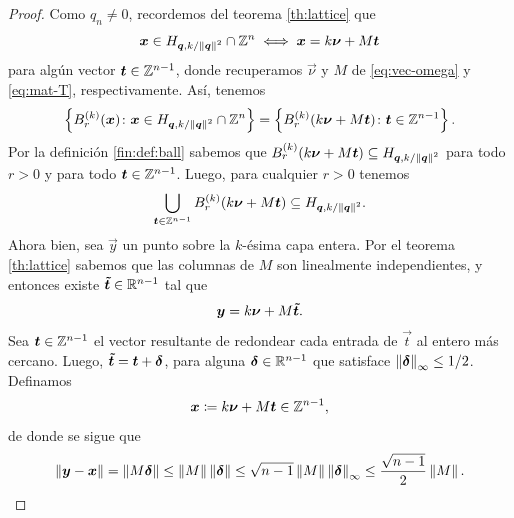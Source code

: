\begin{proof}
	Como $q_n \neq 0$, recordemos del teorema \eqref{th:lattice} que
	\begin{equation*}
		\boldsymbol{x} \in H_{\boldsymbol{\boldsymbol{q}}, k/\left\lVert \boldsymbol{\boldsymbol{q}} \right\rVert^{2}} \cap \mathbb{Z}^n \iff \boldsymbol{x} = k\boldsymbol{\nu} + M\boldsymbol{t}
	\end{equation*}
	para algún vector $\boldsymbol{t} \in \mathbb{Z}^{n-1}$, donde recuperamos $\vec{\nu}$ y $M$ de
	\eqref{eq:vec-omega} y \eqref{eq:mat-T}, respectivamente. Así, tenemos
	\begin{equation*}
		\left\lbrace B_r^{(k)}(\boldsymbol{x}) \colon \boldsymbol{x} \in H_{\boldsymbol{\boldsymbol{q}}, k/\left\lVert \boldsymbol{\boldsymbol{q}} \right\rVert^{2}} \cap
			\mathbb{Z}^n \right\rbrace
			=
		\left\lbrace B_r^{(k)}(k\boldsymbol{\nu} + M\boldsymbol{t}) \colon \boldsymbol{t} \in \mathbb{Z}^{n-1} \right\rbrace.
	\end{equation*}
	Por la definición \ref{fin:def:ball} sabemos que $B_r^{(k)}(k\boldsymbol{\nu} + M\boldsymbol{t}) \subseteq
	H_{\boldsymbol{\boldsymbol{q}}, k/\left\lVert \boldsymbol{\boldsymbol{q}} \right\rVert^{2}}$ para todo $r > 0$ y para todo $\boldsymbol{t} \in \mathbb{Z}^{n-1}$. Luego, para
	cualquier $r > 0$ tenemos
	\begin{equation}
		\label{eq:ball-cover:1}
		\bigcup_{\boldsymbol{t} \in \mathbb{Z}^{n-1}}B_r^{(k)}(k\boldsymbol{\nu} + M\boldsymbol{t}) \subseteq
		H_{\boldsymbol{\boldsymbol{q}}, k/\left\lVert \boldsymbol{\boldsymbol{q}} \right\rVert^{2}}.
	\end{equation}
	Ahora bien, sea $\vec{y}$ un punto sobre la $k$-ésima capa entera. Por el
	teorema \ref{th:lattice} sabemos que las columnas de $M$ son linealmente
	independientes, y entonces existe $\boldsymbol{\tilde{t}} \in \mathbb{R}^{n-1}$ tal que
	\begin{equation*}
		\boldsymbol{y} = k\boldsymbol{\nu} + M\boldsymbol{\tilde{t}}.
	\end{equation*}
	Sea $\boldsymbol{t} \in \mathbb{Z}^{n-1}$ el vector resultante de redondear cada entrada de
	$\vec{t}$ al entero más cercano. Luego, $\boldsymbol{\tilde{t}} = \boldsymbol{t} + \boldsymbol{\delta}$,
	para alguna $\boldsymbol{\delta} \in \mathbb{R}^{n-1}$ que satisface $\left\lVert \boldsymbol{\delta} \right\rVert_{\infty} \leq 1/2$.
	Definamos
	\begin{equation*}
		\boldsymbol{x} \coloneq k\boldsymbol{\nu} + M\boldsymbol{t} \in \mathbb{Z}^{n-1},
	\end{equation*}
	de donde se sigue que
	\begin{equation*}
		\left\lVert \boldsymbol{y} - \boldsymbol{x} \right\rVert
		= \left\lVert M\boldsymbol{\delta} \right\rVert
		\leq \left\lVert M \right\rVert\left\lVert \boldsymbol{\delta} \right\rVert
		\leq \sqrt{n - 1}\left\lVert M \right\rVert\left\lVert \boldsymbol{\delta} \right\rVert_\infty
		\leq \frac{\sqrt{n - 1}}{2}\left\lVert M \right\rVert.
	\end{equation*}

\end{proof}
